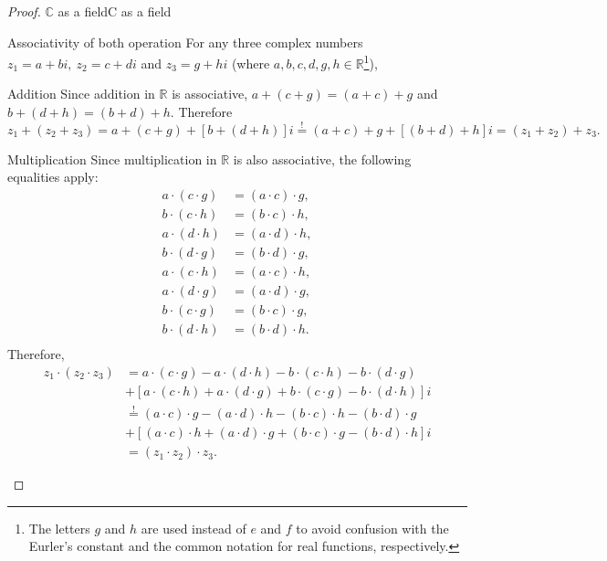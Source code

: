 \begin{proof}{$\bm{\mathbb{C}}$ as a field}{C as a field}
\begin{descitemize}
		\item[Associativity of both operation] For any three complex numbers $z_{1}=a+bi,\ z_{2}=c+di$ and $z_{3}=g+hi$ (where $a,b,c,d,g,h\in\mathbb{R}$\footnote{The letters $g$ and $h$ are used instead of $e$ and $f$ to avoid confusion with the Eurler's constant and the common notation for real functions, respectively.}),
			\begin{listitemize}
			\item[Addition] Since addition in $\mathbb{R}$ is associative, $a+(c+g)=(a+c)+g$ and $b+(d+h)=(b+d)+h$. Therefore
				\[
					z_{1} + (z_{2}+z_{3}) = a+(c+g) + [b+(d+h)]i \overset{!}{=} (a+c)+g + [(b+d)+h]i = (z_{1}+z_{2}) + z_{3}.
				\]
			\item[Multiplication] Since multiplication in $\mathbb{R}$ is also associative, the following equalities apply:
				\begin{align*}
					a\cdot(c\cdot g) &= (a\cdot c)\cdot g,\\
					b\cdot(c\cdot h) &= (b\cdot c)\cdot h,\\
					a\cdot(d\cdot h) &= (a\cdot d)\cdot h,\\
					b\cdot(d\cdot g) &= (b\cdot d)\cdot g,\\
					a\cdot(c\cdot h) &= (a\cdot c)\cdot h,\\
					a\cdot(d\cdot g) &= (a\cdot d)\cdot g,\\
					b\cdot(c\cdot g) &= (b\cdot c)\cdot g,\\
					b\cdot(d\cdot h) &= (b\cdot d)\cdot h.\\
				\end{align*}
				Therefore,
				\begin{align*}
					z_{1}\cdot(z_{2} \cdot z_{3}) &= a\cdot(c\cdot g) - a\cdot(d\cdot h) - b\cdot(c\cdot h) - b\cdot(d\cdot g)\\ &+[a\cdot(c\cdot h) + a\cdot(d\cdot g) + b\cdot(c\cdot g) - b\cdot(d\cdot h)]i\\
					&\overset{!}{=} (a\cdot c)\cdot g - (a\cdot d)\cdot h - (b\cdot c)\cdot h - (b\cdot d)\cdot g\\ &+[(a\cdot c)\cdot h + (a\cdot d)\cdot g + (b\cdot c)\cdot g - (b\cdot d)\cdot h]i\\
					&= (z_{1} \cdot z_{2}) \cdot z_{3}.
				\end{align*}
			\end{listitemize}


\end{descitemize}
\end{proof}
